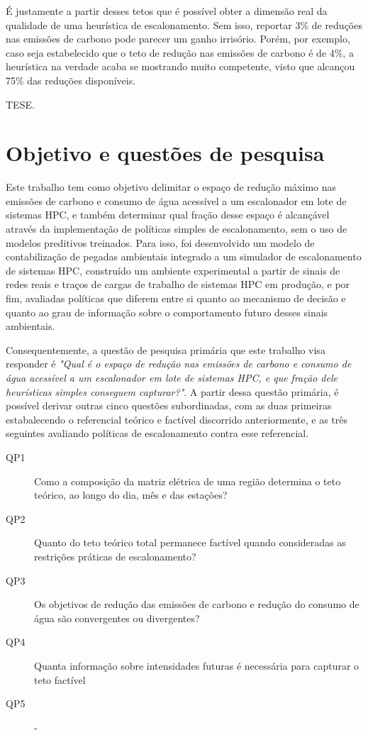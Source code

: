 É justamente a partir desses tetos que é possível obter a dimensão real da qualidade de uma heurística de
escalonamento. Sem isso, reportar 3\% de reduções nas emissões de carbono pode parecer um ganho irrisório.
Porém, por exemplo, caso seja estabelecido que o teto de redução nas emissões de carbono é de 4\%, a heurística
na verdade acaba se mostrando muito competente, visto que alcançou 75\% das reduções disponíveis.

TESE.

\section{Objetivo e questões de pesquisa}

Este trabalho tem como objetivo delimitar o espaço de redução máximo nas emissões de carbono
e consumo de água acessível a um escalonador em lote de sistemas HPC, e também determinar
qual fração desse espaço é alcançável através da implementação de políticas simples de escalonamento,
sem o uso de modelos preditivos treinados. Para isso, foi desenvolvido um modelo de contabilização
de pegadas ambientais integrado a um simulador de escalonamento de sistemas HPC, construído um 
ambiente experimental a partir de sinais de redes reais e traços de cargas de trabalho de sistemas 
HPC em produção, e por fim, avaliadas políticas que diferem entre si quanto ao mecanismo de decisão
e quanto ao grau de informação sobre o comportamento futuro desses sinais ambientais.

Consequentemente, a questão de pesquisa primária que este trabalho visa responder é \emph{"Qual é 
o espaço de redução nas emissões de carbono e consumo de água acessível a um escalonador em lote
de sistemas HPC, e que fração dele heurísticas simples conseguem capturar?"}. A partir dessa questão
primária, é possível derivar outras cinco questões subordinadas, com as duas primeiras estabalecendo
o referencial teórico e factível discorrido anteriormente, e as três seguintes avaliando políticas
de escalonamento contra esse referencial.

\begin{description}
    \item[QP1] Como a composição da matriz elétrica de uma região determina o teto teórico, ao longo do dia,
mês e das estações?
    \item[QP2] Quanto do teto teórico total permanece factível quando consideradas as restrições
práticas de escalonamento?
    \item[QP3] Os objetivos de redução das emissões de carbono e redução do consumo de água são 
convergentes ou divergentes?
    \item[QP4] Quanta informação sobre intensidades futuras é necessária para capturar o teto factível
    \item[QP5] -   
\end{description}

